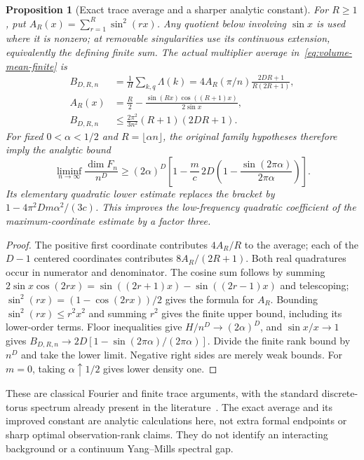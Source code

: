 \documentclass[11pt]{article}
\newtheorem{proposition}[theorem]{Proposition}
\begin{document}
\begin{proposition}[Exact trace average and a sharper analytic constant]\label{prop:volume-average}
For $R\geq1$, put $A_R(x)=\sum_{r=1}^R\sin^2(rx)$. Any quotient below involving $\sin x$ is used where it is nonzero; at removable singularities use its continuous extension, equivalently the defining finite sum. The actual multiplier
average in~\eqref{eq:volume-mean-finite} is
\begin{align*}
 B_{D,R,n}&=\frac1H\sum_{k,q}\Lambda(k)
   =4A_R(\pi/n)\frac{2DR+1}{R(2R+1)},\\
 A_R(x)&=\frac R2-\frac{\sin(Rx)\cos((R+1)x)}{2\sin x},\\
 B_{D,R,n}&\leq\frac{2\pi^2}{3n^2}(R+1)(2DR+1).
\end{align*}
For fixed $0<\alpha<1/2$ and $R=\lfloor\alpha n\rfloor$, the original
family hypotheses therefore imply the analytic bound
\[
 \liminf_{n\to\infty}\frac{\dim F_n}{n^D}
 \geq(2\alpha)^D\left[1-\frac mc\,2D
       \left(1-\frac{\sin(2\pi\alpha)}{2\pi\alpha}\right)\right].
\]
Its elementary quadratic lower estimate replaces the bracket by
$1-4\pi^2Dm\alpha^2/(3c)$. This improves the low-frequency quadratic
coefficient of the maximum-coordinate estimate by a factor three.
\end{proposition}
\begin{proof}
The positive first coordinate contributes $4A_R/R$ to the average; each
of the $D-1$ centered coordinates contributes $8A_R/(2R+1)$. Both real
quadratures occur in numerator and denominator. The cosine sum follows by
summing $2\sin x\cos(2rx)=\sin((2r+1)x)-\sin((2r-1)x)$ and telescoping;
$\sin^2(rx)=(1-\cos(2rx))/2$ gives the formula for $A_R$.
Bounding $\sin^2(rx)\leq r^2x^2$ and summing $r^2$ gives the finite upper
bound, including its lower-order terms. Floor inequalities give
$H/n^D\to(2\alpha)^D$, and $\sin x/x\to1$ gives
$B_{D,R,n}\to2D[1-\sin(2\pi\alpha)/(2\pi\alpha)]$. Divide the finite
rank bound by $n^D$ and take the lower limit. Negative right sides are merely
weak bounds. For $m=0$, taking $\alpha\uparrow1/2$ gives lower density one.
\end{proof}
These are classical Fourier and finite trace arguments, with the standard
discrete-torus spectrum already present in the literature~\cite{lin-wan-zhang}. The exact average
and its improved constant are analytic calculations here, not extra formal
endpoints or sharp optimal observation-rank claims. They do not identify an
interacting background or a continuum Yang--Mills spectral gap.
\end{document}
